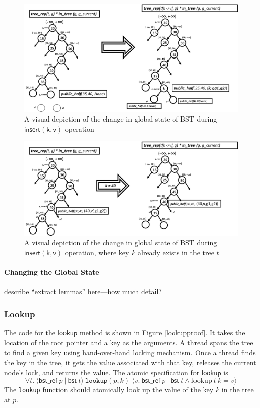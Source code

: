\documentclass[a4paper,USenglish,cleveref, autoref, thm-restate]{lipics-v2021}
\newcommand{\treerep}{\ensuremath{\mathsf{bst}}}
\newcommand{\nodeboxrep}{\ensuremath{\mathsf{bst\_ref}}}
\begin{document}
\begin{figure}[htb]
\centering
\includegraphics[width=150mm,scale=0.5]{../FIG/extract_insert.png}
\caption{A visual depiction of the change in global state of BST during $\mathsf{insert(k,v)}$ operation }
\label{extract_insert}
\end{figure}
\begin{figure}[htb]
\centering
\includegraphics[width=150mm,scale=0.5]{../FIG/extract_insert_2.png}
\caption{A visual depiction of the change in global state of BST during $\mathsf{insert(k,v)}$ operation, where key $k$ already exists in the tree $t$ }
\label{extract_insert2}
\end{figure}

\paragraph{Changing the Global State} describe ``extract lemmas'' here---how much detail?

\subsubsection{Lookup}

The code for the $\mathsf{lookup}$ method is shown in Figure
\ref{lookupproof}. It takes the location of the root pointer and a key
as the arguments. A thread spans the tree to find a given key using
hand-over-hand locking mechanism. Once a thread finds the key in the
tree, it gets the value associated with that key, releases the current
node's lock, and returns the value.
The atomic specification for $\mathsf{lookup}$ is
$$\forall t.\ \langle \nodeboxrep\ p\ |\ \treerep\ t\rangle\ \texttt{lookup}(p, k)\ \langle v.\ \nodeboxrep\ p\ |\ \treerep\ t \land \mathrm{lookup}\ t\ k = v\rangle$$
The \texttt{lookup} function should atomically look up the value of the key $k$ in the tree at $p$.
\end{document}
